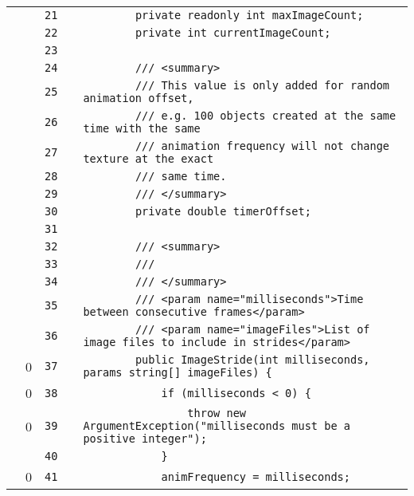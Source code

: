 \documentclass[a4paper,landscape,10pt]{article}
\begin{document}
\begin{longtable}[l]{lrrll}
\cellcolor{gray} &  & \verb~21~ & & \verb~        private readonly int maxImageCount;~\\
\cellcolor{gray} &  & \verb~22~ & & \verb~        private int currentImageCount;~\\
\cellcolor{gray} &  & \verb~23~ & & \verb~~\\
\cellcolor{gray} &  & \verb~24~ & & \verb~        /// <summary>~\\
\cellcolor{gray} &  & \verb~25~ & & \verb~        /// This value is only added for random animation offset,~\\
\cellcolor{gray} &  & \verb~26~ & & \verb~        /// e.g. 100 objects created at the same time with the same~\\
\cellcolor{gray} &  & \verb~27~ & & \verb~        /// animation frequency will not change texture at the exact~\\
\cellcolor{gray} &  & \verb~28~ & & \verb~        /// same time.~\\
\cellcolor{gray} &  & \verb~29~ & & \verb~        /// </summary>~\\
\cellcolor{gray} &  & \verb~30~ & & \verb~        private double timerOffset;~\\
\cellcolor{gray} &  & \verb~31~ & & \verb~~\\
\cellcolor{gray} &  & \verb~32~ & & \verb~        /// <summary>~\\
\cellcolor{gray} &  & \verb~33~ & & \verb~        ///~\\
\cellcolor{gray} &  & \verb~34~ & & \verb~        /// </summary>~\\
\cellcolor{gray} &  & \verb~35~ & & \verb~        /// <param name="milliseconds">Time between consecutive frames</param>~\\
\cellcolor{gray} &  & \verb~36~ & & \verb~        /// <param name="imageFiles">List of image files to include in strides</param>~\\
\cellcolor{red} & 0 & \verb~37~ & & \verb~        public ImageStride(int milliseconds, params string[] imageFiles) {~\\
\cellcolor{red} & 0 & \verb~38~ & & \verb~            if (milliseconds < 0) {~\\
\cellcolor{red} & 0 & \verb~39~ & & \verb~                throw new ArgumentException("milliseconds must be a positive integer");~\\
\cellcolor{gray} &  & \verb~40~ & & \verb~            }~\\
\cellcolor{red} & 0 & \verb~41~ & & \verb~            animFrequency = milliseconds;~\\

\end{longtable}
\end{document}
